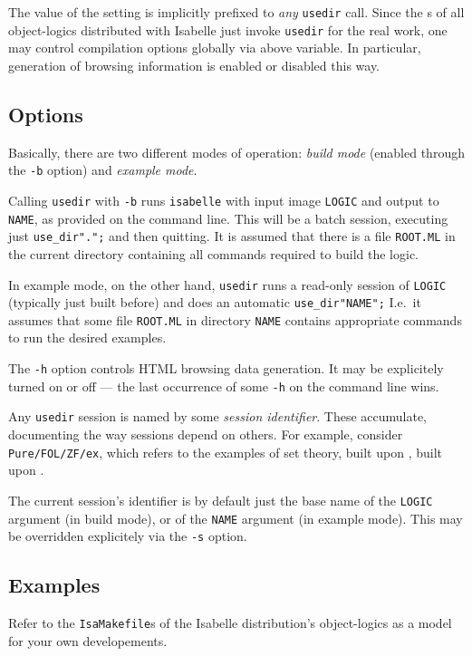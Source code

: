 The value of the  setting is
implicitly prefixed to \emph{any} \texttt{usedir} call. Since the
s of all object-logics distributed with Isabelle
just invoke \texttt{usedir} for the real work, one may control
compilation options globally via above variable. In particular,
generation of  browsing information is enabled or
disabled this way.


\subsection*{Options}

Basically, there are two different modes of operation: \emph{build
  mode} (enabled through the \texttt{-b} option) and \emph{example
  mode}.

Calling \texttt{usedir} with \texttt{-b} runs \texttt{isabelle} with
input image \texttt{LOGIC} and output to \texttt{NAME}, as provided on
the command line. This will be a batch session, executing just
\texttt{use_dir".";} and then quitting. It is assumed
that there is a file \texttt{ROOT.ML} in the current directory
containing all {\ML} commands required to build the logic.

In example mode, on the other hand, \texttt{usedir} runs a read-only
session of \texttt{LOGIC} (typically just built before) and does an
automatic \texttt{use_dir"NAME";} I.e.\ it assumes that some file
\texttt{ROOT.ML} in directory \texttt{NAME} contains appropriate {\ML}
commands to run the desired examples.

\medskip The \texttt{-h} option controls HTML browsing data
generation. It may be explicitely turned on or off --- the last
occurrence of some \texttt{-h} on the command line wins.

\medskip Any \texttt{usedir} session is named by some \emph{session
  identifier}. These accumulate, documenting the way sessions depend
on others. For example, consider \texttt{Pure/FOL/ZF/ex}, which refers
to the examples of {\ZF} set theory, built upon {\FOL}, built upon
{\Pure}.

The current session's identifier is by default just the base name of
the \texttt{LOGIC} argument (in build mode), or of the \texttt{NAME}
argument (in example mode). This may be overridden explicitely via the
\texttt{-s} option.


\subsection*{Examples}

Refer to the \texttt{IsaMakefile}s of the Isabelle distribution's
object-logics as a model for your own developements.
